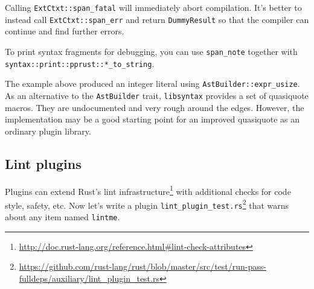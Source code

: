 \documentclass[a4paper,]{book}
\renewcommand{\href}[2]{#2\footnote{\url{#1}}}
\begin{document}
Calling \texttt{ExtCtxt::span\_fatal} will immediately abort
compilation. It's better to instead call \texttt{ExtCtxt::span\_err} and
return \texttt{DummyResult} so that the compiler can continue and find
further errors.

To print syntax fragments for debugging, you can use \texttt{span\_note}
together with \texttt{syntax::print::pprust::*\_to\_string}.

The example above produced an integer literal using
\texttt{AstBuilder::expr\_usize}. As an alternative to the
\texttt{AstBuilder} trait, \texttt{libsyntax} provides a set of
quasiquote macros. They are undocumented and very rough around the
edges. However, the implementation may be a good starting point for an
improved quasiquote as an ordinary plugin library.

\subsection{Lint plugins}\label{lint-plugins}

Plugins can extend
\href{http://doc.rust-lang.org/reference.html\#lint-check-attributes}{Rust's
lint infrastructure} with additional checks for code style, safety, etc.
Now let's write a plugin
\href{https://github.com/rust-lang/rust/blob/master/src/test/run-pass-fulldeps/auxiliary/lint_plugin_test.rs}{\texttt{lint\_plugin\_test.rs}}
that warns about any item named \texttt{lintme}.
\end{document}
